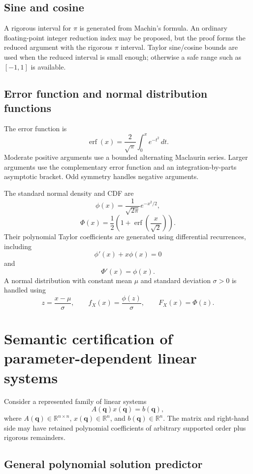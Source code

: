 \documentclass[11pt]{article}
\newcommand{\R}{\mathbb{R}}
\newcommand{\qv}{\mathbf{q}}
\begin{document}
\subsection{Sine and cosine}

A rigorous interval for \(\pi\) is generated from Machin's formula.  An ordinary
floating-point integer reduction index may be proposed, but the proof forms the
reduced argument with the rigorous \(\pi\) interval.  Taylor sine/cosine bounds
are used when the reduced interval is small enough; otherwise a safe range such
as \([-1,1]\) is available.

\subsection{Error function and normal distribution functions}

The error function is
\[
  \operatorname{erf}(x)
  =\frac{2}{\sqrt\pi}\int_0^x e^{-t^2}\,dt.
\]
Moderate positive arguments use a bounded alternating Maclaurin series.  Larger
arguments use the complementary error function and an integration-by-parts
asymptotic bracket.  Odd symmetry handles negative arguments.

The standard normal density and CDF are
\[
  \phi(x)=\frac{1}{\sqrt{2\pi}}e^{-x^2/2},
\]
\[
  \Phi(x)=\frac12\left(1+\operatorname{erf}\left(\frac{x}{\sqrt2}\right)\right).
\]
Their polynomial Taylor coefficients are generated using differential recurrences,
including
\[
  \phi'(x)+x\phi(x)=0
\]
and
\[
  \Phi'(x)=\phi(x).
\]
A normal distribution with constant mean \(\mu\) and standard deviation
\(\sigma>0\) is handled using
\[
  z=\frac{x-\mu}{\sigma},
  \qquad
  f_X(x)=\frac{\phi(z)}{\sigma},
  \qquad
  F_X(x)=\Phi(z).
\]

\section{Semantic certification of parameter-dependent linear systems}

Consider a represented family of linear systems
\[
  A(\qv)x(\qv)=b(\qv),
\]
where \(A(\qv)\in\R^{n\times n}\), \(x(\qv)\in\R^n\), and
\(b(\qv)\in\R^n\).  The matrix and right-hand side may have retained polynomial
coefficients of arbitrary supported order plus rigorous remainders.

\subsection{General polynomial solution predictor}
\end{document}

